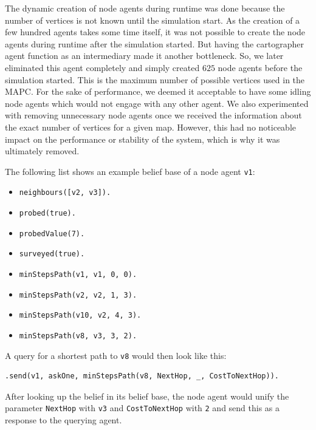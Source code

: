 The dynamic creation of node agents during runtime was done because the number of vertices is not known until the simulation start.
As the creation of a few hundred agents takes some time itself, it was not possible to create the node agents during runtime after the simulation started.
But having the cartographer agent function as an intermediary made it another bottleneck.
So, we later eliminated this agent completely and simply created $625$ node agents before the simulation started.
This is the maximum number of possible vertices used in the MAPC.
For the sake of performance, we deemed it acceptable to have some idling node agents which would not engage with any other agent.
We also experimented with removing unnecessary node agents once we received the information about the exact number of vertices for a given map.
However, this had no noticeable impact on the performance or stability of the system, which is why it was ultimately removed.

\begin{samepage}
The following list shows an example belief base of a node agent \texttt{v1}:
\begin{itemize}
  \item \texttt{neighbours([v2, v3]).}
  \item \texttt{probed(true).}
  \item \texttt{probedValue(7).}
  \item \texttt{surveyed(true).}
  \item \texttt{minStepsPath(v1, v1, 0, 0).}
  \item \texttt{minStepsPath(v2, v2, 1, 3).}
  \item \texttt{minStepsPath(v10, v2, 4, 3).}
  \item \texttt{minStepsPath(v8, v3, 3, 2).}
\end{itemize}
\end{samepage}
A query for a shortest path to \texttt{v8} would then look like this:
\begin{lstlisting}[caption={Query for shortest path from \texttt{v1} to \texttt{v8}}, label={lst:dv_shortestPath_query}]
  .send(v1, askOne, minStepsPath(v8, NextHop, _, CostToNextHop)).
\end{lstlisting}
After looking up the belief in its belief base, the node agent would unify the parameter \texttt{NextHop} with \texttt{v3} and \texttt{CostToNextHop} with \texttt{2} and send this as a response to the querying agent.

